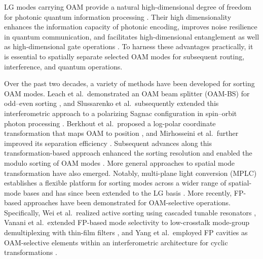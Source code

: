 \documentclass{optica-article}
\begin{document}
%

LG modes carrying OAM provide a natural high-dimensional degree of freedom for photonic quantum information processing \cite{Allen1992,Shen2019_LSA}. Their high dimensionality enhances the information capacity of photonic encoding, improves noise resilience in quantum communication, and facilitates high-dimensional entanglement as well as high-dimensional gate operations \cite{Cerf2002,Cozzolino2019,Erhard2020,Brandt2020}. To harness these advantages practically, it is essential to spatially separate selected OAM modes for subsequent routing, interference, and quantum operations.

Over the past two decades, a variety of methods have been developed for sorting OAM modes. Leach et al.\ demonstrated an OAM beam splitter (OAM-BS) for odd--even sorting \cite{Leach2002}, and Slussarenko et al.\ subsequently extended this interferometric approach to a polarizing Sagnac configuration in spin--orbit photon processing \cite{Slussarenko2010}. Berkhout et al.\ proposed a log-polar coordinate transformation that maps OAM to position \cite{Berkhout2010}, and Mirhosseini et al.\ further improved its separation efficiency \cite{Mirhosseini2013}. Subsequent advances along this transformation-based approach enhanced the sorting resolution \cite{Wen2018} and enabled the modulo sorting of OAM modes \cite{Hu2025_NatPhoton}. More general approaches to spatial mode transformation have also emerged. Notably, multi-plane light conversion (MPLC) establishes a flexible platform for sorting modes across a wider range of spatial-mode bases \cite{Labroille2014} and has since been extended to the LG basis \cite{Fontaine2019}. More recently, FP-based approaches have been demonstrated for OAM-selective operations. Specifically, Wei et al.\ realized active sorting using cascaded tunable resonators \cite{Wei2020_Light}, Vanani et al.\ extended FP-based mode selectivity to low-crosstalk mode-group demultiplexing with thin-film filters \cite{Vanani2022}, and Yang et al.\ employed FP cavities as OAM-selective elements within an interferometric architecture for cyclic transformations \cite{Yang2024_PRJ}.
\end{document}
